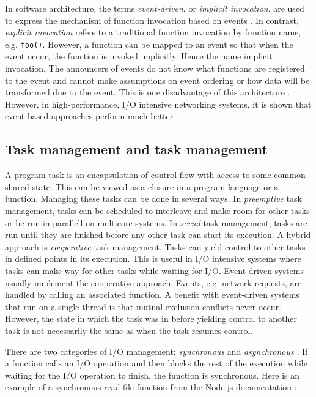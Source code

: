 In software architecture, the terms \textit{event-driven}, or \textit{implicit
invocation}, are used to express the mechanism of function invocation based on
events \cite{garlan1993introduction}. In contrast, \textit{explicit invocation}
refers to a traditional function invocation by function name, e.g.
\lstinline{foo()}. However, a function can be mapped to an event so that when
the event occur, the function is invoked implicitly. Hence the name implicit
invocation. The announcers of events do not know what functions are registered
to the event and cannot make assumptions on event ordering or how data will be
transformed due to the event. This is one disadvantage of this architecture
\cite{garlan1993introduction}. However, in high-performance, I/O intensive
networking systems, it is shown that event-based approaches perform much better
\cite{hu1997measuring}.

\subsection{Task management and task management}
\label{sec:task-management}

A program task is an encapsulation of control flow with access to some common
shared state. This can be viewed as a closure in a program language or a
function. Managing these tasks can be done in several ways. In
\textit{preemptive} task management, tasks can be scheduled to interleave and
make room for other tasks or be run in parallell on multicore systems. In
\textit{serial} task management, tasks are run until they are finished before
any other task can start its execution. A hybrid approach is
\textit{cooperative} task management. Tasks can yield control to other tasks in
defined points in its execution. This is useful in I/O intensive systems where
tasks can make way for other tasks while waiting for I/O. Event-driven systems
usually implement the cooperative approach. Events, e.g.  network requests,
are handled by calling an associated function. A benefit with event-driven
systems that run on a single thread is that mutual exclusion conflicts never
occur. However, the state in which the task was in before yielding control to
another task is not necessarily the same as when the task resumes control.
\cite{adya2002cooperative}

There are two categories of I/O management: \textit{synchronous} and
\textit{asynchronous} \cite{adya2002cooperative}. If a function calls an I/O
operation and then blocks the rest of the execution while waiting for the I/O
operation to finish, the function is synchronous. Here is an example of a
synchronous read file-function from the Node.js documentation
\cite{nodejs-docs}:

